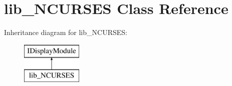 \section{lib\+\_\+\+N\+C\+U\+R\+S\+ES Class Reference}
\label{classlib___n_c_u_r_s_e_s}
Inheritance diagram for lib\+\_\+\+N\+C\+U\+R\+S\+ES\+:\begin{figure}[H]
\begin{center}
\leavevmode
\includegraphics[height=2.000000cm]{classlib___n_c_u_r_s_e_s}
\end{center}
\end{figure}
